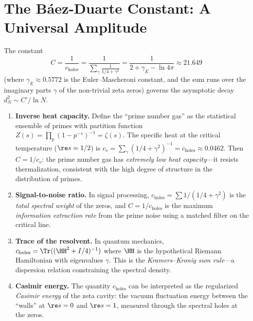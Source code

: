 \section{The B\'aez-Duarte Constant: A Universal Amplitude}
\label{sec:constant}

The constant
\[
  C = \frac{1}{c_{\text{holes}}}
  = \frac{1}{\displaystyle\sum_\gamma \frac{1}{1/4 + \gamma^2}}
  = \frac{1}{2 + \gamma_E - \ln 4\pi}
  \approx 21.649
\]
(where $\gamma_E \approx 0.5772$ is the Euler--Mascheroni constant,
and the sum runs over the imaginary parts $\gamma$ of the non-trivial
zeta zeros) governs the asymptotic decay $d_N^2 \sim C'/\ln N$.

\begin{correspondence}
\label{corr:constant}
\begin{enumerate}
  \item \textbf{Inverse heat capacity.} Define the ``prime number gas''
    as the statistical ensemble of primes with partition function
    $Z(s) = \prod_p (1 - p^{-s})^{-1} = \zeta(s)$. The specific heat
    at the critical temperature ($\re s = 1/2$) is
    $c_v = \sum_\gamma (1/4 + \gamma^2)^{-1} = c_{\text{holes}} \approx 0.0462$.
    Then $C = 1/c_v$: the prime number gas has \emph{extremely low
    heat capacity}---it resists thermalization, consistent with the
    high degree of structure in the distribution of primes.

  \item \textbf{Signal-to-noise ratio.} In signal processing,
    $c_{\text{holes}} = \sum 1/(1/4 + \gamma^2)$ is the \emph{total
    spectral weight} of the zeros, and $C = 1/c_{\text{holes}}$ is
    the maximum \emph{information extraction rate} from the prime
    noise using a matched filter on the critical line.

  \item \textbf{Trace of the resolvent.} In quantum mechanics,
    $c_{\text{holes}} = \Tr((\HH^2 + I/4)^{-1})$ where $\HH$ is
    the hypothetical Riemann Hamiltonian with eigenvalues $\gamma$.
    This is the \emph{Kramers--Kronig sum rule}---a dispersion
    relation constraining the spectral density.

  \item \textbf{Casimir energy.} The quantity $c_{\text{holes}}$
    can be interpreted as the regularized \emph{Casimir energy} of
    the zeta cavity: the vacuum fluctuation energy between the
    ``walls'' at $\re s = 0$ and $\re s = 1$, measured through the
    spectral holes at the zeros.
\end{enumerate}
\end{correspondence}

